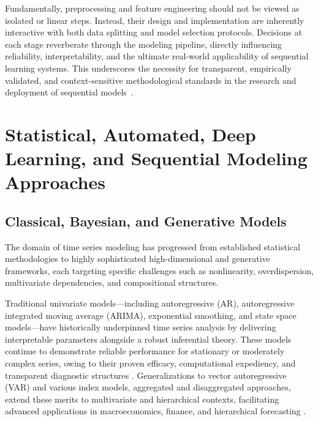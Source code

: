 Fundamentally, preprocessing and feature engineering should not be viewed as isolated or linear steps. Instead, their design and implementation are inherently interactive with both data splitting and model selection protocols. Decisions at each stage reverberate through the modeling pipeline, directly influencing reliability, interpretability, and the ultimate real-world applicability of sequential learning systems. This underscores the necessity for transparent, empirically validated, and context-sensitive methodological standards in the research and deployment of sequential models~\cite{ref5,ref14,ref30,ref83,ref85,ref87}.

\section{Statistical, Automated, Deep Learning, and Sequential Modeling Approaches}

\subsection{Classical, Bayesian, and Generative Models}

The domain of time series modeling has progressed from established statistical methodologies to highly sophisticated high-dimensional and generative frameworks, each targeting specific challenges such as nonlinearity, overdispersion, multivariate dependencies, and compositional structures.

Traditional univariate models—including autoregressive (AR), autoregressive integrated moving average (ARIMA), exponential smoothing, and state space models—have historically underpinned time series analysis by delivering interpretable parameters alongside a robust inferential theory. These models continue to demonstrate reliable performance for stationary or moderately complex series, owing to their proven efficacy, computational expediency, and transparent diagnostic structures \cite{ref1, ref3, ref4, ref5, ref6, ref7, ref8, ref10, ref12, ref13, ref19, ref21, ref22, ref23, ref26, ref29, ref61, ref62, ref63, ref64, ref65, ref66, ref86}. Generalizations to vector autoregressive (VAR) and various index models, aggregated and disaggregated approaches, extend these merits to multivariate and hierarchical contexts, facilitating advanced applications in macroeconomics, finance, and hierarchical forecasting \cite{ref13, ref19, ref22, ref23, ref26, ref29, ref61}.

